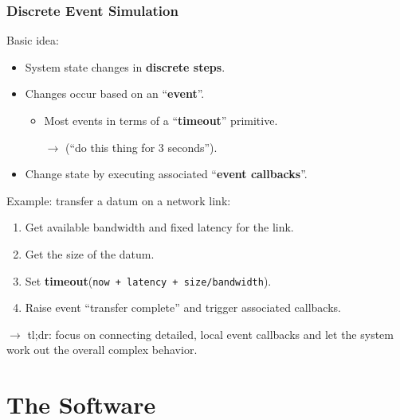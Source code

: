 \documentclass[xcolor=dvipsnames]{beamer}
\begin{document}
\begin{frame}
  \frametitle{Discrete Event Simulation}

  Basic idea:
  \begin{itemize}
  \item System state changes in \textbf{discrete steps}.
  \item Changes occur based on an ``\textbf{event}''. 
    \begin{itemize}
    \item Most events in terms of a ``\textbf{timeout}'' primitive.
    \item[$\rightarrow$] (``do this thing for 3 seconds'').
    \end{itemize}
  \item Change state by executing associated ``\textbf{event callbacks}''.
  \end{itemize}

  \vspace{5mm}

  Example: transfer a datum on a network link:
  \begin{enumerate}\footnotesize
  \item Get available bandwidth and fixed latency for the link.
  \item Get the size of the datum.
  \item Set \textbf{timeout}(\texttt{now + latency + size/bandwidth}).
  \item Raise event ``transfer complete'' and trigger associated callbacks.
  \end{enumerate}

  \vspace{5mm}
  $\rightarrow$ tl;dr: focus on connecting detailed, local event callbacks
  and let the system work out the overall complex behavior.

\end{frame}

\section{The Software}

\begin{frame}
\end{frame}
\end{document}
